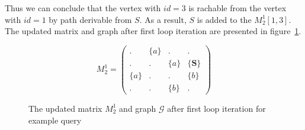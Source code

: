 Thus we can conclude that the vertex with $id=3$ is rachable from the vertex with $id = 1$ by path derivable from $S$. As a result, $S$ is added to the $M_2^1[1,3]$. The updated matrix and graph after first loop iteration are presented in figure~\ref{example:iteration1res}.

\begin{figure}[h]
    \begin{subfigure}[]{0.5\textwidth}
    \centering
    $$
    M_2^1 =
    \begin{pmatrix}
    . & \{a\} & . & .     \\
    . & . & \{a\} & \{\textbf{S}\} \\
    \{a\} & . & . & \{b\} \\
    . & . & \{b\} & .
    \end{pmatrix}
    $$
    \end{subfigure}
    \begin{subfigure}[]{0.4\textwidth}
    \centering
    \end{subfigure}
    \caption{The updated matrix $M_2^1$ and graph $\mathcal{G}$ after first loop iteration for example query}
    \label{example:iteration1res}
\end{figure}


